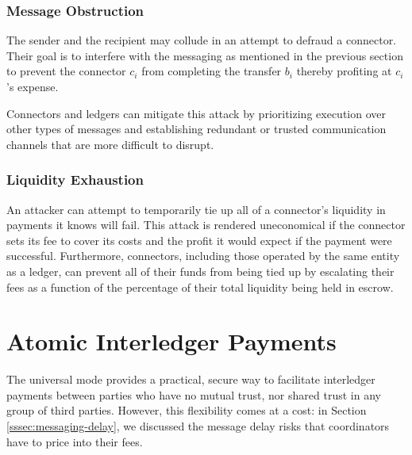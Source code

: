 \documentclass[letterpaper,twocolumn,10pt]{article}
\begin{document}




\subsubsection{Message Obstruction}

The sender and the recipient may collude in an attempt to defraud a connector. Their goal is to interfere with the messaging as mentioned in the previous section to prevent the connector $c_i$ from completing the transfer $b_i$ thereby profiting at $c_i$'s expense.

Connectors and ledgers can mitigate this attack by prioritizing execution over other types of messages and establishing redundant or trusted communication channels that are more difficult to disrupt.

\subsubsection{Liquidity Exhaustion}

An attacker can attempt to temporarily tie up all of a connector's liquidity in payments it knows will fail. This attack is rendered uneconomical if the connector sets its fee to cover its costs and the profit it would expect if the payment were successful. Furthermore, connectors, including those operated by the same entity as a ledger, can prevent all of their funds from being tied up by escalating their fees as a function of the percentage of their total liquidity being held in escrow. 

\section{Atomic Interledger Payments}

The universal mode provides a practical, secure way to facilitate interledger payments between parties who have no mutual trust, nor shared trust in any group of third parties. However, this flexibility comes at a cost: in Section \ref{sssec:messaging-delay}, we discussed the message delay risks that coordinators have to price into their fees.
\end{document}

